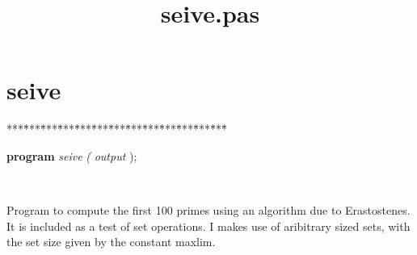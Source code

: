 \documentclass[10pt, a4paper]{article}
\title{seive.pas}
\begin{document}
\maketitle

\tableofcontents
\section{seive}
\begin{tabbing}
***\=***\=***\=***\=***\=***\=***\=***\=***\=***\=***\=***\=***\=\kill
\parbox{14cm}{\textsf{\textbf{program}  \textit{seive} \textit{(} \textit{output} );}}\\
\end{tabbing}
\textrm{Program to compute the first 100 primes using an algorithm due} 
\textrm{to Erastostenes. It is included as a test of set operations.} 
\textrm{I makes use of aribitrary sized sets, with the set size given} 
\textrm{by the constant maxlim.} 
\end{document}

